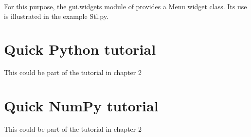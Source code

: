 For this purpose, the gui.widgets module of \pyformex provides a Menu widget class. Its use is illustrated in the example Stl.py.


\section{Quick {Python tutorial}}
\label{sec:python-tutorial}
This could be part of the tutorial in chapter 2

\section{Quick NumPy tutorial}
\label{sec:numpy-tutorial}
This could be part of the tutorial in chapter 2


